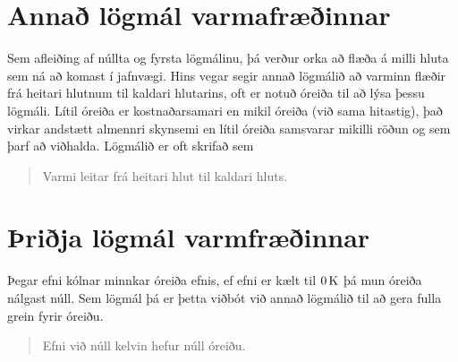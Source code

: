 \section{Annað lögmál varmafræðinnar}
Sem afleiðing af núllta og fyrsta lögmálinu, þá verður orka að flæða á 
milli hluta sem ná að komast í jafnvægi. Hins vegar segir annað lögmálið að 
varminn flæðir frá heitari hlutnum til kaldari hlutarins, oft er notuð óreiða 
til að lýsa þessu lögmáli. Lítil óreiða er kostnaðarsamari en mikil óreiða 
(við sama hitastig), það virkar andstætt almennri skynsemi en lítil óreiða 
samsvarar mikilli röðun og sem þarf að viðhalda. Lögmálið er oft skrifað sem
\begin{quote}
	Varmi leitar frá heitari hlut til kaldari hluts.
\end{quote}

\section{Þriðja lögmál varmfræðinnar}
Þegar efni kólnar minnkar óreiða efnis, ef efni er kælt til $0 \, \text{K}$ þá
mun óreiða nálgast núll. Sem lögmál þá er þetta viðbót við annað lögmálið
til að gera fulla grein fyrir óreiðu.
\begin{quote}
	Efni við núll kelvin hefur núll óreiðu.
\end{quote}